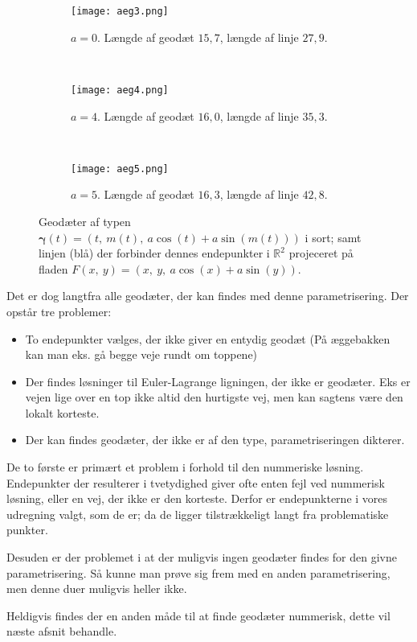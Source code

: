  \begin{figure}
        \centering
        \begin{subfigure}[b]{0.3\textwidth}
                \centering
                \texttt{[image: aeg3.png]}
                \caption{\(a=0\). Længde af geodæt \(15,7\), længde af linje \(27,9\).}
                \label{fig:aeg3}
        \end{subfigure}%
        ~ %
        \begin{subfigure}[b]{0.3\textwidth}
                \centering
                \texttt{[image: aeg4.png]}
                \caption{\(a=4\). Længde af geodæt \(16,0\), længde af linje \(35,3\).}
                \label{fig:aeg4}
        \end{subfigure}
        ~ %
        \begin{subfigure}[b]{0.3\textwidth}
                \centering
                \texttt{[image: aeg5.png]}
                \caption{\(a=5\). Længde af geodæt \(16,3\), længde af linje \(42,8\).}
                \label{fig:aeg5}
        \end{subfigure}
        \caption{
        Geodæter af typen \(\pmb{\gamma}(t) = (t,~m(t),~a\cos(t) + a\sin(m(t)))\) i sort;
        samt linjen (blå) der forbinder dennes endepunkter i \(\mathbb{R}^2\) projeceret på fladen \(F(x,~y)=(x,~y,~a\cos(x)+a\sin(y))\).}%
\end{figure}

Det er dog langtfra alle geodæter, der kan findes med denne parametrisering. Der opstår tre problemer:
\begin{itemize}
\item To endepunkter vælges, der ikke giver en entydig geodæt (På æggebakken kan man eks. gå begge veje rundt om toppene)
\item Der findes løsninger til Euler-Lagrange ligningen, der ikke er geodæter. Eks er vejen lige over en top ikke altid den hurtigste vej,
men kan sagtens være den lokalt korteste.
\item Der kan findes geodæter, der ikke er af den type, parametriseringen dikterer.
\end{itemize}

De to første er primært et problem i forhold til den nummeriske løsning.
Endepunkter der resulterer i tvetydighed giver ofte enten fejl ved nummerisk løsning, eller en vej, der ikke er den korteste.
Derfor er endepunkterne i vores udregning valgt, som de er; da de ligger tilstrækkeligt langt fra problematiske punkter.

Desuden er der problemet i at der muligvis ingen geodæter findes for den givne parametrisering.
Så kunne man prøve sig frem med en anden parametrisering, men denne duer muligvis heller ikke.

Heldigvis findes der en anden måde til at finde geodæter nummerisk, dette vil næste afsnit behandle.

